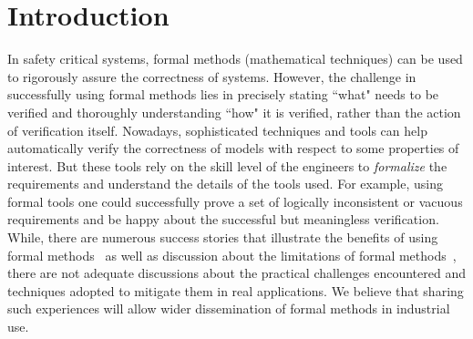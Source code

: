 \section{Introduction}
\label{sec:intro}

 
In safety critical systems, formal methods (mathematical techniques) can be used to rigorously assure the correctness of systems. However, the challenge in successfully using formal methods lies in precisely stating ``what" needs to be verified and thoroughly understanding ``how" it is verified, rather than the action of verification itself. Nowadays, sophisticated techniques and tools can help automatically verify the correctness of models with respect to some properties of interest.  But these tools rely on the skill level of the engineers to \emph{formalize} the requirements and understand the details of the tools used. For example, using formal tools one could successfully prove a set of logically inconsistent or vacuous requirements and be happy about the successful but meaningless verification. While, there are numerous success stories that illustrate the benefits of using formal methods~\cite{Miller03:shalls,Whalen07:FMICS} as well as discussion about the limitations of formal methods~\cite{kneuper1997limits,hall1990seven}, there are not adequate discussions about the practical challenges encountered and techniques adopted to mitigate them in real applications. We believe that sharing such experiences will allow wider dissemination of formal methods in industrial use.

